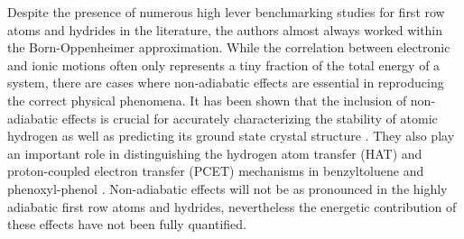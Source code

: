Despite the presence of numerous high lever benchmarking studies for first row atoms and hydrides in the literature, the authors almost always worked within the Born-Oppenheimer approximation. While the correlation between electronic and ionic motions often only represents a tiny fraction of the total energy of a system, there are cases where non-adiabatic effects are essential in reproducing the correct physical phenomena. It has been shown that the inclusion of non-adiabatic effects is crucial for accurately characterizing the stability of atomic hydrogen as well as predicting its ground state crystal structure \cite{Ceperley_1987,Natoli_1993,Natoli_1995}. They also play an important role in distinguishing the hydrogen atom transfer (HAT) and proton-coupled electron transfer (PCET) mechanisms in benzyltoluene and phenoxyl-phenol \cite{Sirjoosingh_PCET}. Non-adiabatic effects will not be as pronounced in the highly adiabatic first row atoms and hydrides, nevertheless the energetic contribution of these effects have not been fully quantified.

